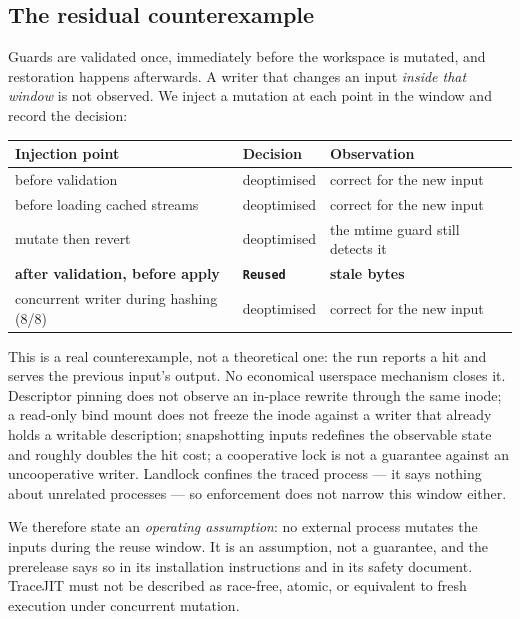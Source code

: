 \subsection{The residual counterexample}
\label{sec:toctou}

Guards are validated once, immediately before the workspace is mutated, and restoration happens
afterwards. A writer that changes an input \emph{inside that window} is not observed. We inject a
mutation at each point in the window and record the decision:

\begin{center}
\begin{tabular}{lll}
\toprule
Injection point & Decision & Observation \\
\midrule
before validation & deoptimised & correct for the new input \\
before loading cached streams & deoptimised & correct for the new input \\
mutate then revert & deoptimised & the mtime guard still detects it \\
\textbf{after validation, before apply} & \textbf{\texttt{Reused}} & \textbf{stale bytes} \\
concurrent writer during hashing (8/8) & deoptimised & correct for the new input \\
\bottomrule
\end{tabular}
\end{center}

This is a real counterexample, not a theoretical one: the run reports a hit and serves the previous
input's output. No economical userspace mechanism closes it. Descriptor pinning does not observe an
in-place rewrite through the same inode; a read-only bind mount does not freeze the inode against a
writer that already holds a writable description; snapshotting inputs redefines the observable
state and roughly doubles the hit cost; a cooperative lock is not a guarantee against an
uncooperative writer. Landlock confines the traced process --- it says nothing about unrelated
processes --- so enforcement does not narrow this window either.

We therefore state an \emph{operating assumption}: no external process mutates the inputs during
the reuse window. It is an assumption, not a guarantee, and the prerelease says so in its
installation instructions and in its safety document. TraceJIT must not be described as race-free,
atomic, or equivalent to fresh execution under concurrent mutation.


